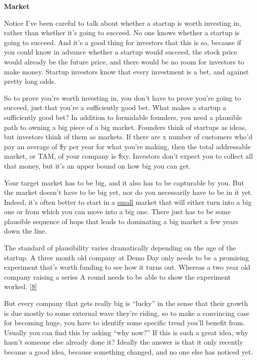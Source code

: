 \textbf{Market}

Notice I've been careful to talk about whether a startup is worth
investing in, rather than whether it's going to succeed. No one knows
whether a startup is going to succeed. And it's a good thing for
investors that this is so, because if you could know in advance whether
a startup would succeed, the stock price would already be the future
price, and there would be no room for investors to make money. Startup
investors know that every investment is a bet, and against pretty long
odds.

So to prove you're worth investing in, you don't have to prove you're
going to succeed, just that you're a sufficiently good bet. What makes a
startup a sufficiently good bet? In addition to formidable founders, you
need a plausible path to owning a big piece of a big market. Founders
think of startups as ideas, but investors think of them as markets. If
there are x number of customers who'd pay an average of \$y per year for
what you're making, then the total addressable market, or TAM, of your
company is \$xy. Investors don't expect you to collect all that money,
but it's an upper bound on how big you can get.

Your target market has to be big, and it also has to be capturable by
you. But the market doesn't have to be big yet, nor do you necessarily
have to be in it yet. Indeed, it's often better to start in a
\href{ds.html}{small} market that will either turn into a big one or
from which you can move into a big one. There just has to be some
plausible sequence of hops that leads to dominating a big market a few
years down the line.

The standard of plausibility varies dramatically depending on the age of
the startup. A three month old company at Demo Day only needs to be a
promising experiment that's worth funding to see how it turns out.
Whereas a two year old company raising a series A round needs to be able
to show the experiment worked. {[}\hyperref[f8n]{8}{]}

But every company that gets really big is ``lucky'' in the sense that
their growth is due mostly to some external wave they're riding, so to
make a convincing case for becoming huge, you have to identify some
specific trend you'll benefit from. Usually you can find this by asking
``why now?'' If this is such a great idea, why hasn't someone else
already done it? Ideally the answer is that it only recently became a
good idea, because something changed, and no one else has noticed yet.

